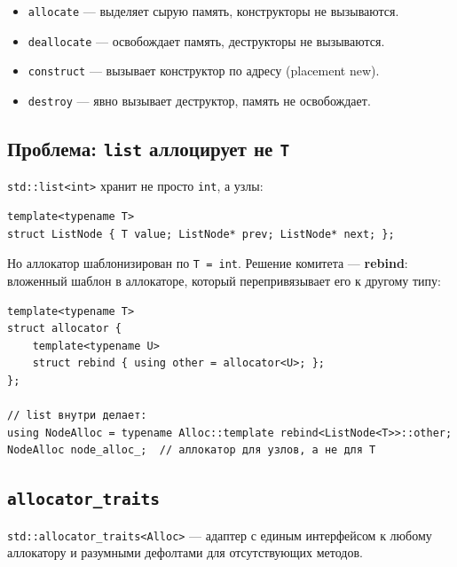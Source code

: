 \documentclass[a4paper,12pt]{article}
\begin{document}
\begin{itemize}
    \item \texttt{allocate} --- выделяет сырую память, конструкторы не вызываются.
    \item \texttt{deallocate} --- освобождает память, деструкторы не вызываются.
    \item \texttt{construct} --- вызывает конструктор по адресу (placement new).
    \item \texttt{destroy} --- явно вызывает деструктор, память не освобождает.
\end{itemize}

\subsection{Проблема: \texttt{list} аллоцирует не \texttt{T}}

\texttt{std::list<int>} хранит не просто \texttt{int}, а узлы:

\begin{lstlisting}
template<typename T>
struct ListNode { T value; ListNode* prev; ListNode* next; };
\end{lstlisting}

Но аллокатор шаблонизирован по \texttt{T = int}. Решение комитета ---
\textbf{rebind}: вложенный шаблон в аллокаторе, который перепривязывает
его к другому типу:

\begin{lstlisting}
template<typename T>
struct allocator {
    template<typename U>
    struct rebind { using other = allocator<U>; };
};

// list внутри делает:
using NodeAlloc = typename Alloc::template rebind<ListNode<T>>::other;
NodeAlloc node_alloc_;  // аллокатор для узлов, а не для T
\end{lstlisting}

\subsection{\texttt{allocator\_traits}}

\texttt{std::allocator\_traits<Alloc>} --- адаптер с единым интерфейсом
к любому аллокатору и разумными дефолтами для отсутствующих методов.
\end{document}
